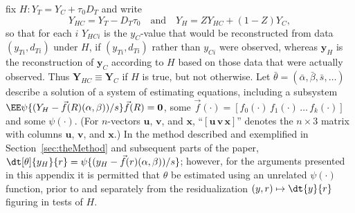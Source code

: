 
fix $H: Y_T = Y_C + \tau_0 D_T$ and write
\begin{equation}
  \label{eq:yhc}
  {Y}_{HC} = {Y}_{T} - {D}_{T}\tau_{0}\quad
  \text{and}  \quad Y_{H} = ZY_{HC} + (1-Z)Y_{C},
\end{equation}
 so that for each $i$  ${Y}_{HC i}$ is the  $y_{C}$-value that would be
 reconstructed from data $(y_{Ti}, d_{Ti})$ under $H$, if $(y_{Ti},
 d_{Ti})$ rather than $y_{Ci}$ were observed, whereas $\mathbf{y}_{H}$ is the reconstruction of $\mathbf{y}_{C}$
 according to $H$ based on those data that were actually observed.  Thus $\mathbf{Y}_{HC} \equiv \mathbf{Y}_{C}$ if $H$ is true, but not otherwise. 
Let $\bar\theta = (\bar\alpha, \bar\beta, \bar{s}, \ldots)$
describe a solution of a system of estimating equations, including a
subsystem $\EE \psi\{ (Y_{H} -
\vec{f}(R) (\alpha, \beta))/s\}\vec{f}(R) =
\mathbf{0}$, some $\vec{f}(\cdot) = [f_{0}(\cdot)\, f_{1}(\cdot)\, \ldots\,
f_{k}(\cdot)]$ and some $\psi(\cdot)$.  (For $n$-vectors $\mathbf{u}$, $\mathbf{v}$, and $\mathbf{x}$,
``$[\mathbf{u}\, \mathbf{v}\, \mathbf{x}]$'' denotes the $n\times 3$ matrix with
columns $\mathbf{u}$, $\mathbf{v}$, and $\mathbf{x}$.)  In the method
described and exemplified in Section~\ref{sec:theMethod} and
subsequent parts of the paper, $\dt[\theta]{y_{H} }{ r} = \psi\{ (y_{H} -
\vec{f}(r) (\alpha, \beta))/s\}$; however, for the arguments presented in
this appendix it is permitted that $\theta$ be estimated using an
unrelated $\psi(\cdot)$ function, prior to and
separately from the residualization $(y,r) \mapsto \dt{y }{ r}$ figuring in tests of $H$.

